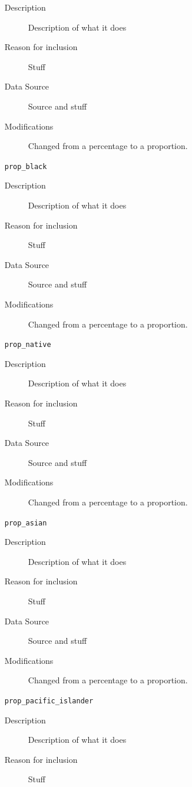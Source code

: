 \documentclass{article}
\begin{document}
\begin{itemize}[label={}, align=left]
\begin{description}
              \item[Description] Description of what it does
              \item[Reason for inclusion] Stuff
              \item[Data Source] Source and stuff
              \item[Modifications] Changed from a percentage to a proportion.
          \end{description}
    \item[\texttt{prop\_black}] \
          \begin{description}
              \item[Description] Description of what it does
              \item[Reason for inclusion] Stuff
              \item[Data Source] Source and stuff
              \item[Modifications] Changed from a percentage to a proportion.
          \end{description}
    \item[\texttt{prop\_native}] \
          \begin{description}
              \item[Description] Description of what it does
              \item[Reason for inclusion] Stuff
              \item[Data Source] Source and stuff
              \item[Modifications] Changed from a percentage to a proportion.
          \end{description}
    \item[\texttt{prop\_asian}] \
          \begin{description}
              \item[Description] Description of what it does
              \item[Reason for inclusion] Stuff
              \item[Data Source] Source and stuff
              \item[Modifications] Changed from a percentage to a proportion.
          \end{description}
    \item[\texttt{prop\_pacific\_islander}] \
          \begin{description}
              \item[Description] Description of what it does
              \item[Reason for inclusion] Stuff

\end{description}
\end{itemize}
\end{document}
